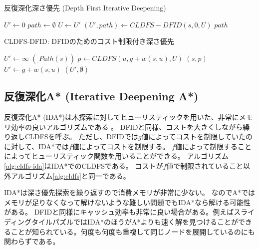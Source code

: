 \begin{algorithm}
\caption{反復深化深さ優先 (Depth First Iterative Deepening)}
\label{alg:depth-first-iterative-deepening}
        $U' \leftarrow 0$\;
        $path \leftarrow \emptyset$\;
         {
          $U \leftarrow U'$\;
          $(U', path) \leftarrow CLDFS-DFID(s, 0, U)$\;
        }
        \Return $path$\;
\end{algorithm}

\begin{algorithm}
\caption{CLDFS-DFID: DFIDのためのコスト制限付き深さ優先}
\label{alg:cldfs}
        $U' \leftarrow \infty$\;
	 {
		\Return $(_, Path(s))$\;
	}
	 {
		 {
			$p \leftarrow CLDFS(u, g + w(s, u), U)$\;
			 {
				\Return $(s, p)$\;
			}
		}
                 {
                  $U' \leftarrow g + w(s, u)$\;
                }
	}
	\Return $(U', \emptyset)$\;
\end{algorithm}


\subsection{反復深化A* (Iterative Deepening A*)}
\label{sec:iterative-deepening-astar}


反復深化A* (IDA*)は木探索に対してヒューリスティックを用いた、非常にメモリ効率の良いアルゴリズムである \cite{korf:85a}。
DFIDと同様、コストを大きくしながら繰り返しCLDFSを呼ぶ。
ただし、DFIDでは$g$値によってコストを制限していたのに対して、IDA*では$f$値によってコストを制限する。
$f$値によって制限することによってヒューリスティック関数を用いることができる。
アルゴリズム\ref{alg:cldfs-ida}はIDA*でのCLDFSである。
コストが$f$値で制限されていること以外アルゴリズム\ref{alg:cldfs}と同一である。

IDA*は深さ優先探索を繰り返すので消費メモリが非常に少ない。
なのでA*ではメモリが足りなくなって解けないような難しい問題でもIDA*なら解ける可能性がある。
DFIDと同様にキャッシュ効率も非常に良い場合がある。例えばスライディングタイルパズルではIDA*のほうがA*よりも速く解を見つけることができることが知られている\cite{korf:85a}。何度も何度も重複して同じノードを展開しているのにも関わらずである。


